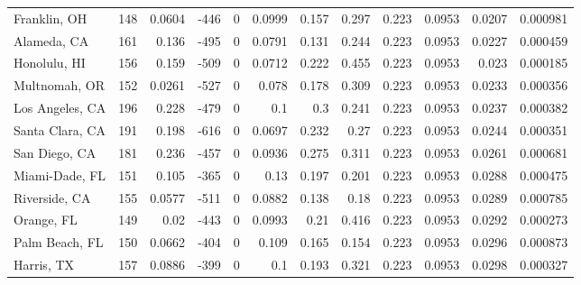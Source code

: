 \documentclass[12pt,letterpaper]{article}
\begin{document}
{\begin{appendices}
\begin{sidewaystable}
{\begin{tabular}{lrrrrrrrrrrr}
 Franklin, OH       & 148   & 0.0604  & -446   &     0 &          0.0999 &           0.157  &         0.297  &              0.223 &             0.0953 &           0.0207  &        0.000981 \\
 Alameda, CA        & 161   & 0.136   & -495   &     0 &          0.0791 &           0.131  &         0.244  &              0.223 &             0.0953 &           0.0227  &        0.000459 \\
 Honolulu, HI       & 156   & 0.159   & -509   &     0 &          0.0712 &           0.222  &         0.455  &              0.223 &             0.0953 &           0.023   &        0.000185 \\
 Multnomah, OR      & 152   & 0.0261  & -527   &     0 &          0.078  &           0.178  &         0.309  &              0.223 &             0.0953 &           0.0233  &        0.000356 \\
 Los Angeles, CA    & 196   & 0.228   & -479   &     0 &          0.1    &           0.3    &         0.241  &              0.223 &             0.0953 &           0.0237  &        0.000382 \\
 Santa Clara, CA    & 191   & 0.198   & -616   &     0 &          0.0697 &           0.232  &         0.27   &              0.223 &             0.0953 &           0.0244  &        0.000351 \\
 San Diego, CA      & 181   & 0.236   & -457   &     0 &          0.0936 &           0.275  &         0.311  &              0.223 &             0.0953 &           0.0261  &        0.000681 \\
 Miami-Dade, FL     & 151   & 0.105   & -365   &     0 &          0.13   &           0.197  &         0.201  &              0.223 &             0.0953 &           0.0288  &        0.000475 \\
 Riverside, CA      & 155   & 0.0577  & -511   &     0 &          0.0882 &           0.138  &         0.18   &              0.223 &             0.0953 &           0.0289  &        0.000785 \\
 Orange, FL         & 149   & 0.02    & -443   &     0 &          0.0993 &           0.21   &         0.416  &              0.223 &             0.0953 &           0.0292  &        0.000273 \\
 Palm Beach, FL     & 150   & 0.0662  & -404   &     0 &          0.109  &           0.165  &         0.154  &              0.223 &             0.0953 &           0.0296  &        0.000873 \\
 Harris, TX         & 157   & 0.0886  & -399   &     0 &          0.1    &           0.193  &         0.321  &              0.223 &             0.0953 &           0.0298  &        0.000327 \\

\end{tabular}}
\end{sidewaystable}
\end{appendices}}
\end{document}
